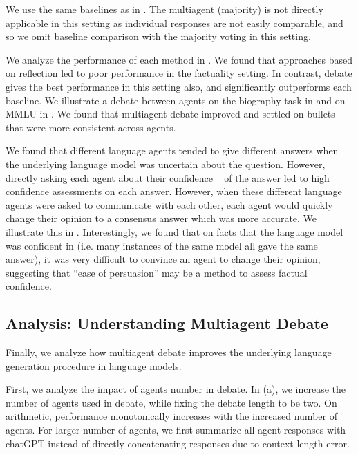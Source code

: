  We use the same baselines as in . The multiagent (majority) is not directly applicable in this setting as individual responses are not easily comparable, and so we omit baseline comparison with the majority voting in this setting.



 We analyze the performance of each method in . We found that approaches based on reflection led to poor performance in the factuality setting. In contrast, debate gives the best performance in this setting also, and significantly outperforms each baseline. We illustrate a debate between agents on the biography task in  and on MMLU in . We found that multiagent debate improved and settled on bullets that were more consistent across agents. 

We found that different language agents tended to give different answers when the underlying language model was uncertain about the question. However, directly asking each agent about their confidence ~\cite{kadavath2022language} of the answer led to high confidence assessments on each answer. However, when these different language agents were asked to communicate with each other, each agent would quickly change their opinion to a consensus answer which was more accurate.  We illustrate this in . Interestingly, we found that on facts that the language model was confident in (i.e. many instances of the same model all gave the same answer), it was very difficult to convince an agent to change their opinion, suggesting that ``ease of persuasion'' may be a method to assess factual confidence.   









\vspace{-5pt}
\subsection{Analysis: Understanding Multiagent Debate}



Finally, we analyze how multiagent debate improves the underlying language generation procedure in language models.



 First, we analyze the impact of agents number in debate. In (a), we increase the number of agents used in debate, while fixing the debate length to be two. On arithmetic, performance monotonically increases with the increased number of agents. For larger number of agents, we first summarize all agent responses with chatGPT instead of directly concatenating responses due to context length error. 



